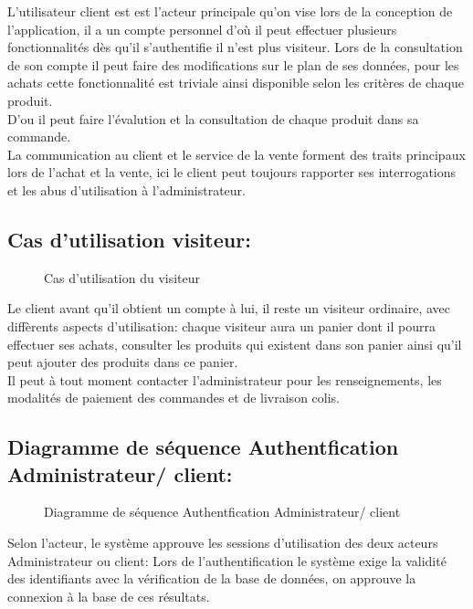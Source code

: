 \documentclass[a4paper]{report}
\begin{document}
\begin{doublespace}
	L'utilisateur client est est l'acteur principale qu'on vise
	lors de la conception de l'application, il a un compte personnel d'où il peut
	effectuer plusieurs fonctionnalités dès qu'il s'authentifie il n'est plus
	visiteur. Lors de la consultation de son compte il peut faire des modifications
	sur le plan de ses données, pour les achats cette fonctionnalité est triviale
	ainsi disponible selon les critères de chaque produit.\\D'ou il peut faire
	l'évalution et la consultation de chaque produit dans sa commande. \\ La
	communication au client et le service de la vente forment des traits principaux
	lors de l'achat et la vente, ici le client peut toujours rapporter ses
	interrogations et les abus d'utilisation à l'administrateur.
	\newpage
	\subsection{Cas d'utilisation visiteur:}
	\begin{figure}[H]
		\begin{center}
			\caption{Cas d'utilisation du visiteur}
		\end{center}
	\end{figure}
	
	Le client avant qu'il obtient un compte à lui, il reste un
	visiteur ordinaire, avec diffèrents aspects d'utilisation: chaque visiteur aura
	un panier dont il pourra effectuer ses achats, consulter les produits qui
	existent dans son panier ainsi qu'il peut ajouter des produits dans ce
	panier.\\
	Il peut à tout moment contacter l'administrateur pour les
	renseignements, les modalités de paiement des commandes et de livraison colis.
	
	\subsection{Diagramme de séquence Authentfication
	Administrateur/ client:}
	\begin{figure}[H]
		\begin{center}
			\caption{Diagramme de séquence Authentfication
			Administrateur/ client}
		\end{center}
	\end{figure}
	Selon l'acteur, le système approuve les sessions
	d'utilisation des deux acteurs Administrateur ou client: Lors de
	l'authentification le système exige la validité des identifiants avec la
	vérification de la base de données, on approuve la connexion à la base de ces
	résultats.

\end{doublespace}
\end{document}
